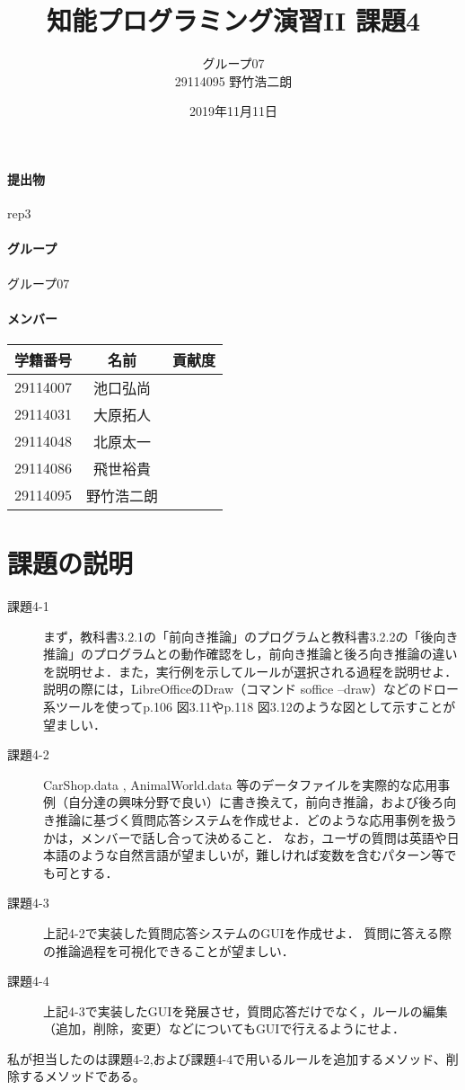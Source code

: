 \documentclass[a4j]{jarticle}
\title{知能プログラミング演習II 課題4}
\author{グループ07\\
  29114095 野竹浩二朗\\
}
\date{2019年11月11日}
\begin{document}
\maketitle

\paragraph{提出物} rep3
\paragraph{グループ} グループ07
\paragraph{メンバー}
\begin{tabular}{|c|c|c|}
  \hline\hline
  学籍番号&名前&貢献度\\
  \hline\hline
  29114007&池口弘尚&\\
  \hline
  29114031&大原拓人&\\
  \hline
  29114048&北原太一&\\
  \hline
  29114086&飛世裕貴&\\
  \hline
  29114095&野竹浩二朗&\\
  \hline
\end{tabular}



\section{課題の説明}
\begin{description}
\item[課題4-1] まず，教科書3.2.1の「前向き推論」のプログラムと教科書3.2.2の「後向き推論」のプログラムとの動作確認をし，前向き推論と後ろ向き推論の違いを説明せよ．また，実行例を示してルールが選択される過程を説明せよ．説明の際には，LibreOfficeのDraw（コマンド soffice --draw）などのドロー系ツールを使ってp.106 図3.11やp.118 図3.12のような図として示すことが望ましい．

\item[課題4-2] CarShop.data , AnimalWorld.data 等のデータファイルを実際的な応用事例（自分達の興味分野で良い）に書き換えて，前向き推論，および後ろ向き推論に基づく質問応答システムを作成せよ．どのような応用事例を扱うかは，メンバーで話し合って決めること．
なお，ユーザの質問は英語や日本語のような自然言語が望ましいが，難しければ変数を含むパターン等でも可とする．

\item[課題4-3] 上記4-2で実装した質問応答システムのGUIを作成せよ．
質問に答える際の推論過程を可視化できることが望ましい．

\item[課題4-4]上記4-3で実装したGUIを発展させ，質問応答だけでなく，ルールの編集（追加，削除，変更）などについてもGUIで行えるようにせよ．

\end{description}
私が担当したのは課題4-2,および課題4-4で用いるルールを追加するメソッド、削除するメソッドである。
\end{document}
